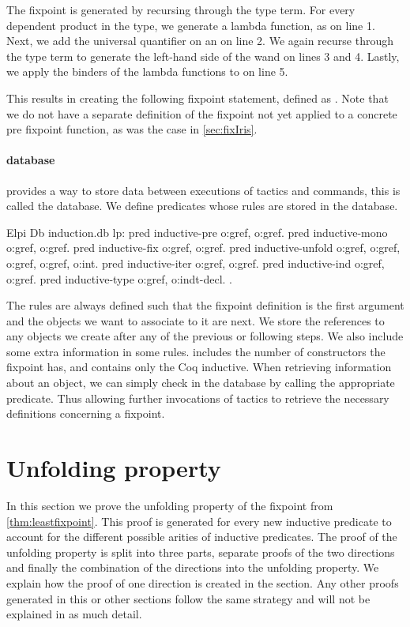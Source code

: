 \documentclass[thesis.tex]{subfiles}
\begin{document}
The fixpoint is generated by recursing through the type term. For every dependent product in the type, we generate a lambda function, as on line 1. Next, we add the universal quantifier on an  on line 2. We again recurse through the type term to generate the left-hand side of the wand on lines 3 and 4. Lastly, we apply the binders of the lambda functions to  on line 5.

This results in creating the following fixpoint statement, defined as . Note that we do not have a separate definition of the fixpoint not yet applied to a concrete pre fixpoint function, as was the case in \cref{sec:fixIris}.

\paragraph{\ce database}
\ce provides a way to store data between executions of tactics and commands, this is called the database. We define predicates whose rules are stored in the database.
\begin{coqcode}
  Elpi Db induction.db lp:{{
    pred inductive-pre o:gref, o:gref.
    pred inductive-mono o:gref, o:gref.
    pred inductive-fix o:gref, o:gref.
    pred inductive-unfold o:gref, o:gref, o:gref, 
                          o:gref, o:int.
    pred inductive-iter o:gref, o:gref.
    pred inductive-ind o:gref, o:gref.
    pred inductive-type o:gref, o:indt-decl.
  }}.
\end{coqcode}
The rules are always defined such that the fixpoint definition is the first argument and the objects we want to associate to it are next. We store the references to any objects we create after any of the previous or following steps. We also include some extra information in some rules.  includes the number of constructors the fixpoint has, and  contains only the Coq inductive. When retrieving information about an object, we can simply check in the database by calling the appropriate predicate. Thus allowing further invocations of tactics to retrieve the necessary definitions concerning a fixpoint.

\section{Unfolding property}\label{sec:unfolding}
In this section we prove the unfolding property of the fixpoint from \cref{thm:leastfixpoint}. This proof is generated for every new inductive predicate to account for the different possible arities of inductive predicates. The proof of the unfolding property is split into three parts, separate proofs of the two directions and finally the combination of the directions into the unfolding property. We explain how the proof of one direction is created in the section. Any other proofs generated in this or other sections follow the same strategy and will not be explained in as much detail.
\end{document}

